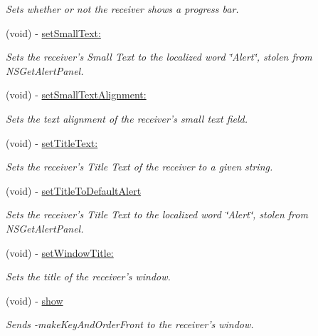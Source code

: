 \begin{CompactItemize}
\begin{CompactList}\small\item\em Sets whether or not the receiver shows a progress bar. \item\end{CompactList}\item 
(void) - \hyperlink{interface_s_s_y_alert_48bbcefe2f439c4185d19c5d34a744c1}{setSmallText:}
\begin{CompactList}\small\item\em Sets the receiver's Small Text to the localized word \char`\"{}Alert\char`\"{}, stolen from NSGetAlertPanel. \item\end{CompactList}\item 
(void) - \hyperlink{interface_s_s_y_alert_7742169df21e1a6a03f4efba3a913555}{setSmallTextAlignment:}
\begin{CompactList}\small\item\em Sets the text alignment of the receiver's small text field. \item\end{CompactList}\item 
(void) - \hyperlink{interface_s_s_y_alert_e215fbf01c8ec15042ec40bb23429482}{setTitleText:}
\begin{CompactList}\small\item\em Sets the receiver's Title Text of the receiver to a given string. \item\end{CompactList}\item 
(void) - \hyperlink{interface_s_s_y_alert_e816db2d738fc965ab7ff2210c174535}{setTitleToDefaultAlert}
\begin{CompactList}\small\item\em Sets the receiver's Title Text to the localized word \char`\"{}Alert\char`\"{}, stolen from NSGetAlertPanel. \item\end{CompactList}\item 
(void) - \hyperlink{interface_s_s_y_alert_6e1c01e863e79182a929fa7678fb6fd9}{setWindowTitle:}
\begin{CompactList}\small\item\em Sets the title of the receiver's window. \item\end{CompactList}\item 
\hypertarget{interface_s_s_y_alert_4d012f3f229f8e44dc0646e62890b49f}{
(void) - \hyperlink{interface_s_s_y_alert_4d012f3f229f8e44dc0646e62890b49f}{show}}
\label{interface_s_s_y_alert_4d012f3f229f8e44dc0646e62890b49f}

\begin{CompactList}\small\item\em Sends -makeKeyAndOrderFront to the receiver's window. \item\end{CompactList}\end{CompactItemize}
